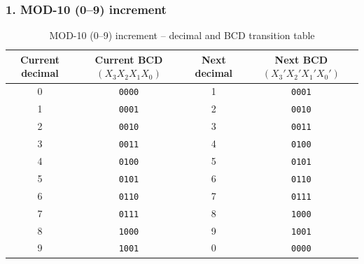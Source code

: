 \documentclass[12pt,letterpaper]{article}
\begin{document}
\subsubsection{1. MOD-10 (0--9) increment}
\begin{table}[H]\centering
\caption{MOD-10 (0--9) increment -- decimal and BCD transition table}
\label{tab:kmap-mod10-inc-trans}
\scriptsize
\begin{tabular}{c c c c}\toprule
Current decimal & Current BCD $(X_3X_2X_1X_0)$ & Next decimal & Next BCD $(X_3'X_2'X_1'X_0')$ \\
\midrule
0 & \texttt{0000} & 1 & \texttt{0001} \\
1 & \texttt{0001} & 2 & \texttt{0010} \\
2 & \texttt{0010} & 3 & \texttt{0011} \\
3 & \texttt{0011} & 4 & \texttt{0100} \\
4 & \texttt{0100} & 5 & \texttt{0101} \\
5 & \texttt{0101} & 6 & \texttt{0110} \\
6 & \texttt{0110} & 7 & \texttt{0111} \\
7 & \texttt{0111} & 8 & \texttt{1000} \\
8 & \texttt{1000} & 9 & \texttt{1001} \\
9 & \texttt{1001} & 0 & \texttt{0000} \\
\bottomrule
\end{tabular}
\end{table}
\end{document}
